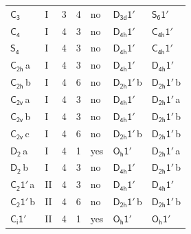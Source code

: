 \documentclass[10pt,a4paper]{article}
\numberwithin{equation}{section}
\newcommand{\grp}[1]{\mathsf{#1}}
\newcommand{\clsletter}[1]{\,{\scriptsize\color{black!55}#1}}
\begin{document}
{\begin{longtable}{@{}llrrlll@{}}
\href{../../../rotation/data/pdf/C3.pdf}{$\grp{C_{3}}$} & I & 3 & 4 & no & \href{D3d-1p.pdf}{$\grp{D_{3d}1'}$} & \href{S6-1p.pdf}{$\grp{S_{6}1'}$}\\
\href{../../../rotation/data/pdf/C4.pdf}{$\grp{C_{4}}$} & I & 4 & 3 & no & \href{D4h-1p.pdf}{$\grp{D_{4h}1'}$} & \href{C4h-1p.pdf}{$\grp{C_{4h}1'}$}\\
\href{../../../rotation/data/pdf/S4.pdf}{$\grp{S_{4}}$} & I & 4 & 3 & no & \href{D4h-1p.pdf}{$\grp{D_{4h}1'}$} & \href{C4h-1p.pdf}{$\grp{C_{4h}1'}$}\\
\href{../../../rotation/data/pdf/C2h.pdf}{$\grp{C_{2h}}$}\clsletter{a} & I & 4 & 3 & no & \href{D4h-1p.pdf}{$\grp{D_{4h}1'}$} & \href{D4h-1p.pdf}{$\grp{D_{4h}1'}$}\\
\href{../../../rotation/data/pdf/C2h.pdf}{$\grp{C_{2h}}$}\clsletter{b} & I & 4 & 6 & no & \href{D2h-1p.pdf}{$\grp{D_{2h}1'}$}\clsletter{b} & \href{D2h-1p.pdf}{$\grp{D_{2h}1'}$}\clsletter{b}\\
\href{../../../rotation/data/pdf/C2v.pdf}{$\grp{C_{2v}}$}\clsletter{a} & I & 4 & 3 & no & \href{D4h-1p.pdf}{$\grp{D_{4h}1'}$} & \href{D2h-1p.pdf}{$\grp{D_{2h}1'}$}\clsletter{a}\\
\href{../../../rotation/data/pdf/C2v.pdf}{$\grp{C_{2v}}$}\clsletter{b} & I & 4 & 3 & no & \href{D4h-1p.pdf}{$\grp{D_{4h}1'}$} & \href{D2h-1p.pdf}{$\grp{D_{2h}1'}$}\clsletter{b}\\
\href{../../../rotation/data/pdf/C2v.pdf}{$\grp{C_{2v}}$}\clsletter{c} & I & 4 & 6 & no & \href{D2h-1p.pdf}{$\grp{D_{2h}1'}$}\clsletter{b} & \href{D2h-1p.pdf}{$\grp{D_{2h}1'}$}\clsletter{b}\\
\href{../../../rotation/data/pdf/D2.pdf}{$\grp{D_{2}}$}\clsletter{a} & I & 4 & 1 & yes & \href{Oh-1p.pdf}{$\grp{O_{h}1'}$} & \href{D2h-1p.pdf}{$\grp{D_{2h}1'}$}\clsletter{a}\\
\href{../../../rotation/data/pdf/D2.pdf}{$\grp{D_{2}}$}\clsletter{b} & I & 4 & 3 & no & \href{D4h-1p.pdf}{$\grp{D_{4h}1'}$} & \href{D2h-1p.pdf}{$\grp{D_{2h}1'}$}\clsletter{b}\\
\href{C2-1p.pdf}{$\grp{C_{2}1'}$}\clsletter{a} & II & 4 & 3 & no & \href{D4h-1p.pdf}{$\grp{D_{4h}1'}$} & \href{D4h-1p.pdf}{$\grp{D_{4h}1'}$}\\
\href{C2-1p.pdf}{$\grp{C_{2}1'}$}\clsletter{b} & II & 4 & 6 & no & \href{D2h-1p.pdf}{$\grp{D_{2h}1'}$}\clsletter{b} & \href{D2h-1p.pdf}{$\grp{D_{2h}1'}$}\clsletter{b}\\
\href{S2-1p.pdf}{$\grp{C_{i}1'}$} & II & 4 & 1 & yes & \href{Oh-1p.pdf}{$\grp{O_{h}1'}$} & \href{Oh-1p.pdf}{$\grp{O_{h}1'}$}\\

\end{longtable}}
\end{document}
